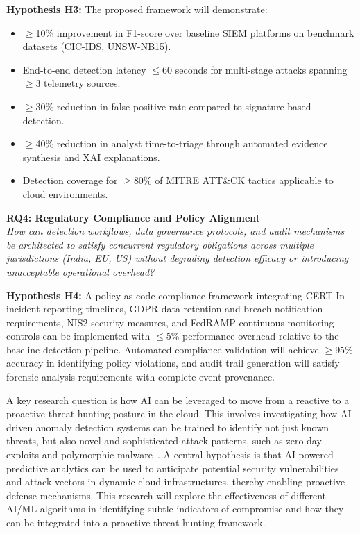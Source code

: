 \textbf{Hypothesis H3:} The proposed framework will demonstrate:
\begin{itemize}
    \item $\geq$10\% improvement in F1-score over baseline SIEM platforms on benchmark datasets (CIC-IDS, UNSW-NB15).
    \item End-to-end detection latency $\leq$60 seconds for multi-stage attacks spanning $\geq$3 telemetry sources.
    \item $\geq$30\% reduction in false positive rate compared to signature-based detection.
    \item $\geq$40\% reduction in analyst time-to-triage through automated evidence synthesis and XAI explanations.
    \item Detection coverage for $\geq$80\% of MITRE ATT\&CK tactics applicable to cloud environments.
\end{itemize}

\textbf{RQ4: Regulatory Compliance and Policy Alignment} \\
\emph{How can detection workflows, data governance protocols, and audit mechanisms be architected to satisfy concurrent regulatory obligations across multiple jurisdictions (India, EU, US) without degrading detection efficacy or introducing unacceptable operational overhead?}

\textbf{Hypothesis H4:} A policy-as-code compliance framework integrating CERT-In incident reporting timelines, GDPR data retention and breach notification requirements, NIS2 security measures, and FedRAMP continuous monitoring controls can be implemented with $\leq$5\% performance overhead relative to the baseline detection pipeline. Automated compliance validation will achieve $\geq$95\% accuracy in identifying policy violations, and audit trail generation will satisfy forensic analysis requirements with complete event provenance.

A key research question is how AI can be leveraged to move from a reactive to a proactive threat hunting posture in the cloud. This involves investigating how AI-driven anomaly detection systems can be trained to identify not just known threats, but also novel and sophisticated attack patterns, such as zero-day exploits and polymorphic malware~\cite{ai_threat_hunting_2024}. A central hypothesis is that AI-powered predictive analytics can be used to anticipate potential security vulnerabilities and attack vectors in dynamic cloud infrastructures, thereby enabling proactive defense mechanisms. This research will explore the effectiveness of different AI/ML algorithms in identifying subtle indicators of compromise and how they can be integrated into a proactive threat hunting framework.

